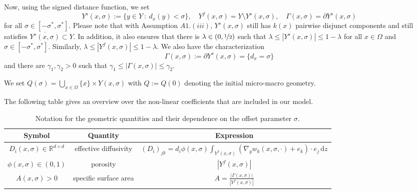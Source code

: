 \documentclass[reqno, 11pt]{amsart}
\numberwithin{equation}{section}
\def\R{{\Bbb R}}
\def\R{{\mathbb R}}
\newcommand{\di}[1]{\,\mathrm{d}#1}
\begin{document}
Now, using the signed distance function, we set
\[
Y^s(x,\sigma):=\{y\in Y\ :\ d_x(y)<\sigma\},\quad Y^f(x,\sigma)=Y\setminus Y^s(x,\sigma),\quad\Gamma(x,\sigma)=\partial Y^s(x,\sigma)
\]
%
for all $\sigma\in[-\sigma^*,\sigma^*]$.
Please note that with Assumption $A1.(iii)$, $Y^s(x,\sigma)$ still has $k(x)$ pairwise disjunct components and still satisfies $\overline{Y^s(x,\sigma)}\subset Y$.
In addition, it also ensures that there is $\lambda\in(0,\nicefrac12)$ such that $\lambda\le|Y^s(x,\sigma)|\le1-\lambda$ for all $x\in\Omega$ and $\sigma\in[-\sigma^*,\sigma^*]$.
Similarly, $\lambda\le|Y^f(x,\sigma)|\le1-\lambda$.
We also have the characterization
%
\[
\Gamma(x,\sigma):=\partial Y^s(x,\sigma)=\{d_x=\sigma\}
\]
and there are $\gamma_1,\gamma_2>0$ such that $\gamma_1\le|\Gamma(x,\sigma)|\le\gamma_2$.
%

We set $Q(\sigma)=\bigcup_{x\in\Omega}\{x\}\times Y(x,\sigma)$ with $Q:=Q(0)$ denoting the initial micro-macro geometry.

The following table gives an overview over the non-linear coefficients that are included in our model. 
\begin{table}[h]
\begin{tabular}{|c|c|c|}
\hline
Symbol  						& Quantity 										& Expression	 \\ 
\hline
$D_i(x,\sigma)\in\R^{d\times d}$						& effective diffusivity				& $(D_i)_{jk}=d_i\phi(x,\sigma)\int_{Y^f(x,\sigma)}(\nabla_y w_{k}(x,\sigma,\cdot)+e_{k})\cdot e_j\di{z}$     \\ 
\hline
$\phi(x,\sigma)\in(0,1)$						& porosity					 					& $|Y^f(x,\sigma)|$\\
\hline
$A(x,\sigma)>0$						&specific surface area					 					& $A=\frac{|\Gamma(x,\sigma)|}{|Y^f(x,\sigma)|}$\\
\hline
\end{tabular}
\caption{
Notation for the geometric quantities and their dependence on the offset parameter $\sigma$.
}
\end{table}
\end{document}
